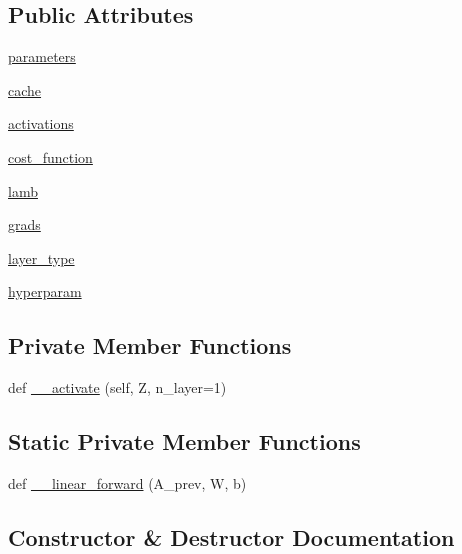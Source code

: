 \subsection*{Public Attributes}
\begin{DoxyCompactItemize}
\item 
\mbox{\hyperlink{classnn_1_1nn_a69da89bd6d17dbc8596ab586b7678237}{parameters}}
\item 
\mbox{\hyperlink{classnn_1_1nn_a1f75a6242fc9ee82ca2632e18979b4d3}{cache}}
\item 
\mbox{\hyperlink{classnn_1_1nn_acb7fb4cc0db120b007ef1ab1f82d7ba0}{activations}}
\item 
\mbox{\hyperlink{classnn_1_1nn_adb4a96a154d03db3722022600e134c7f}{cost\+\_\+function}}
\item 
\mbox{\hyperlink{classnn_1_1nn_a11943885141afc3a47049b9d2769fd1b}{lamb}}
\item 
\mbox{\hyperlink{classnn_1_1nn_a50e9804c2895867c31833f877c7d5d60}{grads}}
\item 
\mbox{\hyperlink{classnn_1_1nn_a4850861a98c6058da6df33c52ae886a4}{layer\+\_\+type}}
\item 
\mbox{\hyperlink{classnn_1_1nn_a394100bd2fb034cd818612776713a3f9}{hyperparam}}
\end{DoxyCompactItemize}
\subsection*{Private Member Functions}
\begin{DoxyCompactItemize}
\item 
def \mbox{\hyperlink{classnn_1_1nn_a1cefed6bf4fd61d437e68c901a15fda2}{\+\_\+\+\_\+activate}} (self, Z, n\+\_\+layer=1)
\end{DoxyCompactItemize}
\subsection*{Static Private Member Functions}
\begin{DoxyCompactItemize}
\item 
def \mbox{\hyperlink{classnn_1_1nn_a78173fb77f846a71e27f097b29e701f8}{\+\_\+\+\_\+linear\+\_\+forward}} (A\+\_\+prev, W, b)
\end{DoxyCompactItemize}


\subsection{Constructor \& Destructor Documentation}
\mbox{\label{classnn_1_1nn_a74489f9e02e4fca4de94ab099f3b28b4}} 
